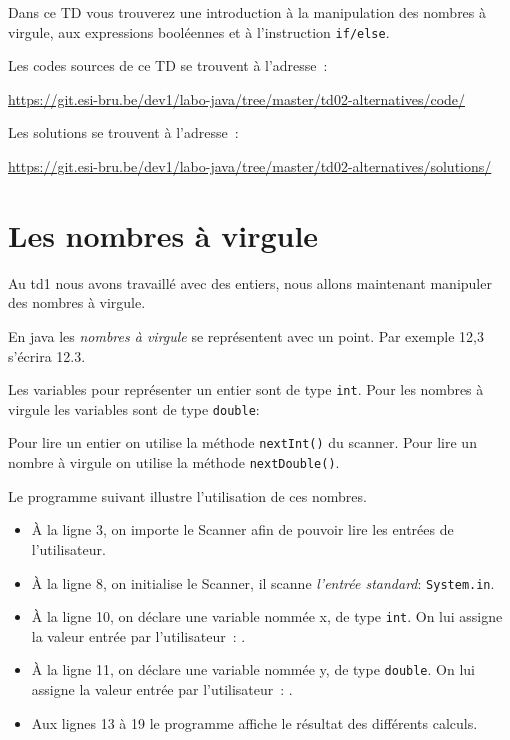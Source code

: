 \documentclass[a4paper,11pt]{article}
\date{2018 -- 2019}
\newcommand{\publicbasepath}{https://git.esi-bru.be/dev1/labo-java/tree/master/td02-alternatives}
\newcommand{\solutionspublicpath}{\publicbasepath/solutions/}
\renewcommand{\listingpublicpath}{\publicbasepath/code/}
\begin{document}
\entete
\titre
{}
\lastedit


	Dans ce TD vous trouverez une introduction à la manipulation des nombres à virgule,
	aux expressions booléennes et à l'instruction \texttt{if/else}.
	
	Les codes sources de ce TD se trouvent à l'adresse~: 
	
	\url{\listingpublicpath}
	
	Les solutions se trouvent à l'adresse~:
	
		\url{\solutionspublicpath}

	
	\tableofcontents

	\newpage

\section{Les nombres à virgule}


	Au td1 nous avons travaillé avec des entiers, nous allons maintenant 
	manipuler des nombres à virgule.

	En java les \emph{nombres à virgule} se représentent avec un point. 
	Par exemple 12,3 s'écrira 12.3.

	Les variables pour représenter un entier sont de type \texttt{int}.
	Pour les nombres à virgule les variables sont de type \texttt{double}:
	

	Pour lire un entier on utilise la méthode \texttt{nextInt()} du scanner.
	Pour lire un nombre à virgule on utilise la méthode \texttt{nextDouble()}.
	


	Le programme suivant illustre l'utilisation de ces nombres.

	\bigskip

	\begin{itemize}
		\item \`A la ligne 3, on importe le Scanner afin de pouvoir lire les entrées de l'utilisateur.
		\item \`A la ligne 8, on initialise le Scanner, il scanne \emph{l'entrée standard}: 
			\texttt{System.in}.

		\item \`A la ligne 10, on déclare une variable nommée x, de type \texttt{int}. 
			On lui assigne la valeur entrée par l'utilisateur~: .

		\item \`A la ligne 11, on déclare une variable nommée y, de type \texttt{double}.
			On lui assigne la valeur entrée par l'utilisateur~: .

		\item Aux lignes 13 à 19 le programme affiche le résultat des différents calculs.

	\end{itemize}
\end{document}
